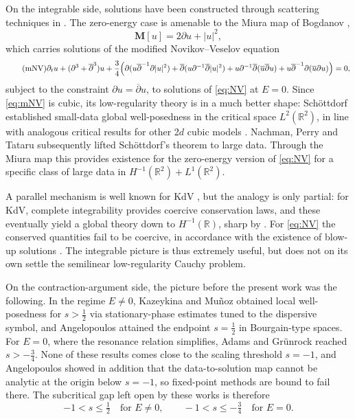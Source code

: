 \documentclass[a4paper,
11pt,  reqno]{amsart}
\newcommand{\5}{\textup{V}}
\theoremstyle{remark}
\newcommand{\R}{\mathbb{R}}
\numberwithin{equation}{section}
\numberwithin{theorem}{section}
\begin{document}
On the integrable side, solutions have been constructed through scattering techniques in \cite{BLMP, Tsai, Perry, MusicPerry}. The zero-energy case is amenable to the Miura map of Bogdanov \cite{Bogdanov},
\begin{equation}
\mathbf{M}[u]= 2\partial u + |u|^2,
\end{equation}
which carries solutions of the modified Novikov--Veselov equation
\begin{equation}\label{eq:mNV}\tag{mNV}
\partial_t u + (\partial^3+\overline{\partial}^3) u + \frac34\Bigl(\partial(u\overline{\partial}^{-1}\partial |u|^2) + \overline{\partial}(u\partial^{-1}\overline{\partial}|u|^2) + u\partial^{-1}\overline{\partial}(\overline{u}\overline{\partial}u) + u\overline{\partial}^{-1}\partial(\overline{u}\partial u)\Bigr)=0,
\end{equation}
subject to the constraint $\partial u=\overline{\partial} u$, to solutions of \eqref{eq:NV} at $E=0$. Since \eqref{eq:mNV} is cubic, its low-regularity theory is in a much better shape: Sch\"ottdorf \cite{Schottdorf} established small-data global well-posedness in the critical space $L^2(\R^2)$, in line with analogous critical results for other 2$d$ cubic models \cite{MPS_Dysthe, CorreiaKinoshita}. Nachman, Perry and Tataru \cite{NPT_mNV} subsequently lifted Sch\"ottdorf's theorem to large data. Through the Miura map this provides existence for the zero-energy version of \eqref{eq:NV} for a specific class of large data in $H^{-1}(\R^2)+L^1(\R^2)$.

\medskip

A parallel mechanism is well known for KdV \cite{Miura, KPST_miura, CKSTT_sharp_kdv, KT06, BuckmasterKoch, KillipVisan_kdv}, but the analogy is only partial: for KdV, complete integrability provides coercive conservation laws, and these eventually yield a global theory down to $H^{-1}(\R)$, sharp by \cite{Molinet_ill_line}. For \eqref{eq:NV} the conserved quantities fail to be coercive, in accordance with the existence of blow-up solutions \cite{TaimanovTsarev}. The integrable picture is thus extremely useful, but does not on its own settle the semilinear low-regularity Cauchy problem.

\medskip

On the contraction-argument side, the picture before the present work was the following. In the regime $E\neq 0$, Kazeykina and Mu\~noz \cite{kazeykinamunoz1, kazeykinamunoz2} obtained local well-posedness for $s>\tfrac12$ via stationary-phase estimates tuned to the dispersive symbol, and Angelopoulos \cite{angelopolous} attained the endpoint $s=\tfrac12$ in Bourgain-type spaces. For $E=0$, where the resonance relation simplifies, Adams and Gr\"unrock \cite{adamsgrunrock} reached $s>-\tfrac34$. None of these results comes close to the scaling threshold $s=-1$, and Angelopoulos showed in addition that the data-to-solution map cannot be analytic at the origin below $s=-1$, so fixed-point methods are bound to fail there. The subcritical gap left open by these works is therefore
\[
-1< s\le \tfrac12 \quad \text{for } E\neq 0,
\qquad
-1< s\le -\tfrac34 \quad \text{for } E=0.
\]
\end{document}
